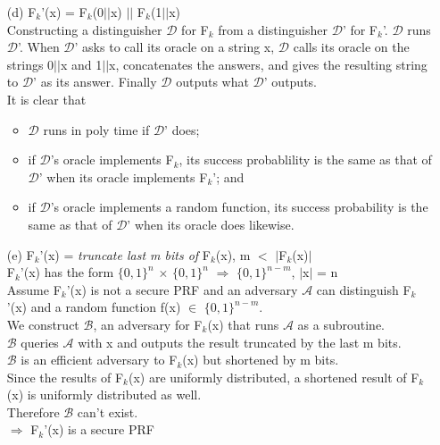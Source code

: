 \begin{itemize}
\item[(d)]
	F\(_{k}\)'(x) =  F\(_{k}\)(0\(\vert \vert\)x) \(\vert \vert\) F\(_{k}\)(1\(\vert \vert\)x) \\
	Constructing a distinguisher \(\mathcal{D}\) for F\(_{k}\) from a distinguisher \(\mathcal{D}\)' for F\(_{k}\)'. \(\mathcal{D}\) runs \(\mathcal{D}\)'. 
	When \(\mathcal{D}\)' asks to call its oracle on a string x, \(\mathcal{D}\) calls its oracle on the strings 0\(\vert \vert\)x and 1\(\vert \vert\)x, concatenates
	the answers, and gives the resulting string to \(\mathcal{D}\)' as its answer. Finally \(\mathcal{D}\) outputs what  \(\mathcal{D}\)' outputs. \\
	It is clear that
	\begin{itemize}
		\item \(\mathcal{D}\) runs in poly time if \(\mathcal{D}\)' does;
		\item if \(\mathcal{D}\)'s oracle implements F\(_{k}\), its success probablility is the same as that of  \(\mathcal{D}\)' when its oracle implements F\(_{k}\)'; and
		\item if  \(\mathcal{D}\)'s oracle implements a random function, its success probability is the same as that of  \(\mathcal{D}\)' when its oracle does likewise.
	\end{itemize}
\item[(e)]
	F\(_{k}\)'(x)  = \textit{truncate last m bits of}  F\(_{k}\)(x), m \(<\) \(\vert\)F\(_{k}\)(x)\(\vert\) \\
	F\(_{k}\)'(x) has the form \(\{0,1\}^{n}\) \(\times\) \(\{0,1\}^{n}\) \(\Rightarrow\) \(\{0,1\}^{n-m}\), \(\vert\)x\(\vert\) = n \\
	Assume F\(_{k}\)'(x) is not a secure PRF and an adversary \(\mathcal{A}\) can distinguish F\(_{k}\)'(x) and a random function f(x) \(\in\) \(\{0,1\}^{n-m}\). \\
	We construct \(\mathcal{B}\), an adversary for F\(_{k}\)(x) that runs \(\mathcal{A}\) as a subroutine.\\
	\(\mathcal{B}\) queries \(\mathcal{A}\) with x and outputs the result %
	truncated by the last m bits. \\
	\(\mathcal{B}\) is an efficient adversary to F\(_{k}\)(x) but shortened by m bits.\\
	Since the results of F\(_{k}\)(x) are uniformly distributed, a shortened result of F\(_{k}\)(x) is uniformly distributed as well. \\
	Therefore \(\mathcal{B}\) can't exist. \\
	\(\Rightarrow\) F\(_{k}\)'(x) is a secure PRF \\
\end{itemize}